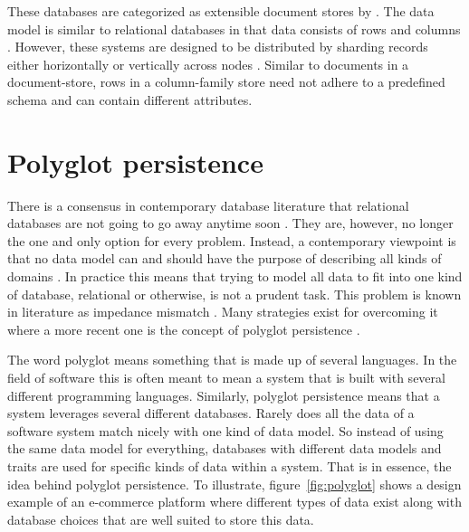 These databases are categorized as extensible document stores by \cite{Catell}. The data model is similar to relational databases in that data consists of rows and columns \cite{Catell}. However, these systems are designed to be distributed by sharding records either horizontally or vertically across nodes \cite{10rules}. Similar to documents in a document-store, rows in a column-family store need not adhere to a predefined schema and can contain different attributes. 


\section{Polyglot persistence}
\label{sec:pp}
There is a consensus in contemporary database literature that relational databases are not going to go away anytime soon \cite{Catell, NoSQLDistilled, NoSQLSurvey}. They are, however, no longer the one and only option for every problem. Instead, a contemporary viewpoint is that no data model can and should have the purpose of describing all kinds of domains \cite{NoSQLDistilled, NoSQLSurvey}. In practice this means that trying to model all data to fit into one kind of database, relational or otherwise, is not a prudent task. This problem is known in literature as impedance mismatch \cite{ORM}. Many strategies \cite{ORM} exist for overcoming it where a more recent one is the concept of polyglot persistence \cite{NoSQLDistilled}. 

The word polyglot means something that is made up of several languages. In the field of software this is often meant to mean a system that is built with several different programming languages. Similarly, polyglot persistence means that a system leverages several different databases. Rarely does all the data of a software system match nicely with one kind of data model. So instead of using the same data model for everything, databases with different data models and traits are used for specific kinds of data within a system. That is in essence, the idea behind polyglot persistence. To illustrate, figure~\ref{fig:polyglot} shows a design example of an e-commerce platform where different types of data exist along with database choices that are well suited to store this data.


